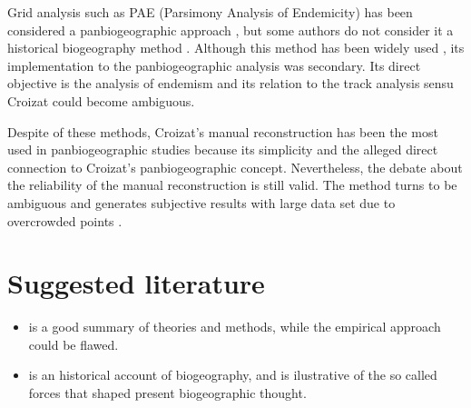 Grid analysis such as PAE (Parsimony Analysis of Endemicity) has been
considered a panbiogeographic approach \citep{Crawetal1999, Luna-vegaetal2000,
MorroneMarquez2001, Morrone2004c}, but some authors do not consider it a
historical biogeography method \citep{Humphries2000, Garcia-Barros2002}.
Although this method has been widely used \citep{Luna-vegaetal2000,
MorroneMarquez2001, Huidobroetal2006, Mihocetal2006, Espinosa-Perezetal2009,
Contreras-Medinaetal2007}, its implementation to the panbiogeographic analysis
was secondary. Its direct objective is the analysis of endemism and its relation
to the track analysis sensu Croizat could become ambiguous.

Despite of these methods, Croizat's manual reconstruction has been the most used
in panbiogeographic studies because its simplicity and the alleged direct
connection to Croizat's panbiogeographic concept. Nevertheless, the debate about
the reliability of the manual reconstruction is still
valid. The method turns to be ambiguous and generates subjective results with
large data set due to overcrowded points \citep{Franco-Rosselli2001, Liria2008}.



\section{Suggested literature}

\begin{itemize}
\item \citet{Crawetal1999} is a good summary of theories and methods, while the
empirical approach could be flawed.

\item \citet{Crisci2001} is an historical account of biogeography, and is
ilustrative of the so called forces that shaped present biogeographic thought.
\end{itemize}
